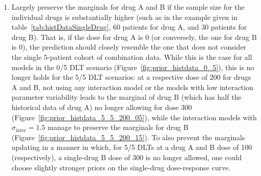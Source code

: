 \documentclass[AMA,STIX1COL]{WileyNJD-v2}
\begin{document}
\begin{enumerate}
\begin{enumerate}
\end{enumerate}
\item Largely preserve the marginals for drug A and B if the sample size for the individual drugs is substantially higher (such as in the example given in table~\ref{tab:histDataSingleDrug}, 60 patients for drug A, and 30 patients for drug B). That is, if the dose for drug A is $0$ (or conversely, the one for drug B is $0$), the prediction should closely resemble the one that does not consider the single 5-patient cohort of combination data. While this is the case for all models in the 0/5 DLT scenario (Figure~\ref{fig:prior_histdata_0_5}), this is no longer holds for the 5/5 DLT scenarios: at a respective dose of 200 for drugs A and B, not using any interaction model or the models with low interaction parameter variability leads to the marginal of drug B (which has half the historical data of drug A) no longer allowing for dose 300 (Figure~\ref{fig:prior_histdata_5_5_200_05}), while the interaction models with $\sigma_\text{inter} = 1.5$ manage to preserve the marginals for drug B (Figure~\ref{fig:prior_histdata_5_5_200_15}). To also prevent the marginals updating in a manner in which, for 5/5 DLTs at a drug A and B dose of 100 (respectively), a single-drug B dose of 300 is no longer allowed, one could choose slightly stronger priors on the single-drug dose-response curve.
\end{enumerate}
\end{document}
